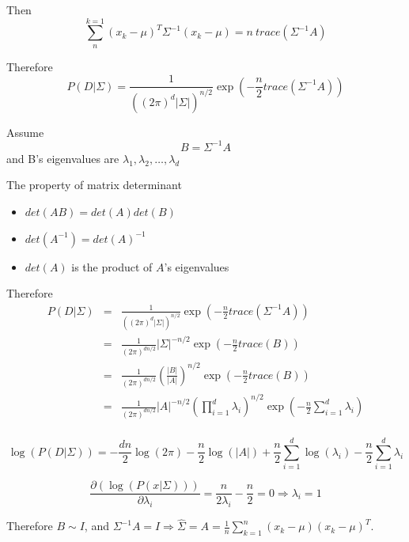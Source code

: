 \documentclass[letterpaper,10pt]{article}
\begin{document}
Then
\begin{equation}
\sum_{n}^{k=1}{(x_k-\mu)^T\Sigma^{-1}(x_k-\mu)} = n~trace(\Sigma^{-1}A)
\end{equation}

Therefore
\begin{equation}
P(D|\Sigma) = \frac{1}{((2\pi)^d|\Sigma|)^{n/2}}\exp(-\frac{n}{2}trace(\Sigma^{-1}A))
\end{equation}

Assume
\begin{equation}
B=\Sigma^{-1}A
\end{equation}
and B's eigenvalues are $\lambda_1,\lambda_2,\dots,\lambda_d$

The property of matrix determinant
\begin{itemize}
	\item $det(AB)=det(A)det(B)$
	\item $det(A^{-1})=det(A)^{-1}$
	\item $det(A)$ is the product of $A$'s eigenvalues
\end{itemize}

Therefore
\begin{equation}
\begin{array}{rcl}
P(D|\Sigma) & = & \frac{1}{((2\pi)^d|\Sigma|)^{n/2}}\exp(-\frac{n}{2}trace(\Sigma^{-1}A)) \\
			& = & \frac{1}{(2\pi)^{dn/2}}|\Sigma|^{-n/2}\exp(-\frac{n}{2}trace(B)) \\
			& = & \frac{1}{(2\pi)^{dn/2}}(\frac{|B|}{|A|})^{n/2}\exp(-\frac{n}{2}trace(B)) \\
			& = & \frac{1}{(2\pi)^{dn/2}}|A|^{-n/2}(\prod_{i=1}^{d}{\lambda_i})^{n/2}\exp(-\frac{n}{2}\sum_{i=1}^{d}{\lambda_i}) \\
\end{array}
\end{equation}

\begin{equation}
\log(P(D|\Sigma))=-\frac{dn}{2}\log(2\pi)-\frac{n}{2}\log(|A|)+\frac{n}{2}\sum_{i=1}^{d}{\log(\lambda_i)}-\frac{n}{2}\sum_{i=1}^{d}{\lambda_i}
\end{equation}

\begin{equation}
\frac{\partial(\log(P(x|\Sigma)))}{\partial\lambda_i}=\frac{n}{2\lambda_i}-\frac{n}{2}=0 \Rightarrow \lambda_i=1
\end{equation}

Therefore $B \sim I$, and $\Sigma^{-1}A=I \Rightarrow \hat{\Sigma}=A=\frac{1}{n}\sum_{k=1}^{n}(x_k-\mu)(x_k-\mu)^T$.
\end{document}
